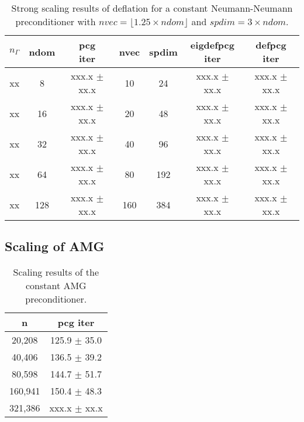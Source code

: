 \documentclass{article}
\begin{document}
\begin{table}[ht]
	\caption{Strong scaling results of deflation for a constant Neumann-Neumann preconditioner with $nvec=\lfloor1.25\times ndom\rfloor$ and $spdim=3\times ndom$.}
	\centering
	\begin{tabular}{|c|c|c|c|c|c|c|}
		\hline
		$n_\Gamma$ & ndom & \makecell{pcg\\ iter} & nvec & spdim & \makecell{eigdefpcg\\ iter} & \makecell{defpcg\\ iter}\\
		\hline
		xx  &   8 & xxx.x $\pm$  xx.x &  10 &  24 & xxx.x $\pm$ xx.x & xxx.x $\pm$ xx.x \\
		xx  &  16 & xxx.x $\pm$  xx.x &  20 &  48 & xxx.x $\pm$ xx.x & xxx.x $\pm$ xx.x \\
		xx  &  32 & xxx.x $\pm$  xx.x &  40 &  96 & xxx.x $\pm$ xx.x & xxx.x $\pm$ xx.x \\
		xx  &  64 & xxx.x $\pm$  xx.x &  80 & 192 & xxx.x $\pm$ xx.x & xxx.x $\pm$ xx.x \\
		xx  & 128 & xxx.x $\pm$  xx.x & 160 & 384 & xxx.x $\pm$ xx.x & xxx.x $\pm$ xx.x \\
		\hline
	\end{tabular}
	\label{Tab:040}
\end{table}

\subsection{Scaling of AMG}

\begin{table}[ht]
	\caption{Scaling results of the constant AMG preconditioner.}
	\centering
	\begin{tabular}{|c|c|}
		\hline
		n & pcg iter \\
		\hline
		20,208  & 125.9 $\pm$ 35.0 \\
		40,406  & 136.5 $\pm$ 39.2  \\
		80,598  & 144.7 $\pm$ 51.7  \\
		160,941 & 150.4 $\pm$ 48.3  \\
		321,386 & xxx.x $\pm$ xx.x  \\
		\hline
	\end{tabular}
	\label{Tab:020}
\end{table}
\end{document}
